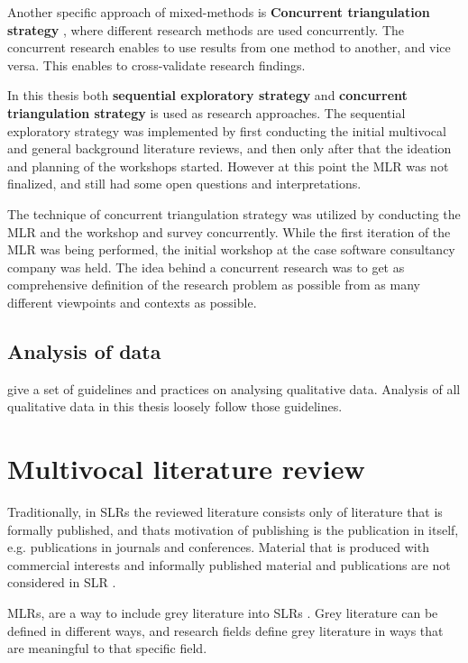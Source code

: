\documentclass[english, 12pt, a4paper, sci, utf8, a-1b, online]{aaltothesis}
\begin{document}
Another specific approach of mixed-methods is \textbf{Concurrent triangulation strategy} \citep{easterbrook2008selecting}, where different research methods are used concurrently. The concurrent research enables to use results from one method to another, and vice versa. This enables to cross-validate research findings.

In this thesis both \textbf{sequential exploratory strategy} and \textbf{concurrent triangulation strategy} is used as research approaches. The sequential exploratory strategy was implemented by first conducting the initial multivocal and general background literature reviews, and then only after that the ideation and planning of the workshops started. However at this point the MLR was not finalized, and still had some open questions and interpretations.

The technique of concurrent triangulation strategy was utilized by conducting the MLR and the workshop and survey concurrently. While the first iteration of the MLR was being performed, the initial workshop at the case software consultancy company was held. The idea behind a concurrent research was to get as comprehensive definition of the research problem as possible from as many different viewpoints and contexts as possible.

\subsection{Analysis of data}

\cite{analyzing-qualitative-data} give a set of guidelines and practices on analysing qualitative data. Analysis of all qualitative data in this thesis loosely follow those guidelines.

\clearpage
\section{Multivocal literature review}

Traditionally, in SLRs the reviewed literature consists only of literature that is formally published, and thats motivation of publishing is the publication in itself, e.g. publications in journals and conferences. Material that is produced with commercial interests and informally published material and publications are not considered in SLR \citep{guidelines-for-MLR}.

MLRs, are a way to include grey literature into SLRs \citep{the-need-for-MLR}. Grey literature can be defined in different ways, and research fields define grey literature in ways that are meaningful to that specific field.
\end{document}
